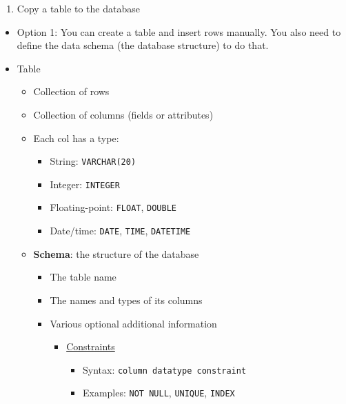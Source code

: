 \documentclass[
]{book}
\providecommand{\tightlist}{%
  \setlength{\itemsep}{0pt}\setlength{\parskip}{0pt}}
\begin{document}
\begin{enumerate}
\def\labelenumi{\arabic{enumi}.}
\setcounter{enumi}{1}
\tightlist
\item
  Copy a table to the database
\end{enumerate}

\begin{itemize}
\item
  Option 1: You can create a table and insert rows manually. You also need to define the data schema (the database structure) to do that.
\item
  Table

  \begin{itemize}
  \tightlist
  \item
    Collection of rows
  \item
    Collection of columns (fields or attributes)
  \item
    Each col has a type:

    \begin{itemize}
    \tightlist
    \item
      String: \texttt{VARCHAR(20)}
    \item
      Integer: \texttt{INTEGER}
    \item
      Floating-point: \texttt{FLOAT}, \texttt{DOUBLE}
    \item
      Date/time: \texttt{DATE}, \texttt{TIME}, \texttt{DATETIME}
    \end{itemize}
  \item
    \textbf{Schema}: the structure of the database

    \begin{itemize}
    \tightlist
    \item
      The table name
    \item
      The names and types of its columns
    \item
      Various optional additional information

      \begin{itemize}
      \tightlist
      \item
        \href{https://www.w3schools.com/sql/sql_constraints.asp}{Constraints}

        \begin{itemize}
        \tightlist
        \item
          Syntax: \texttt{column\ datatype\ constraint}
        \item
          Examples: \texttt{NOT\ NULL}, \texttt{UNIQUE}, \texttt{INDEX}
        \end{itemize}
      \end{itemize}
    \end{itemize}
  \end{itemize}
\end{itemize}
\end{document}
